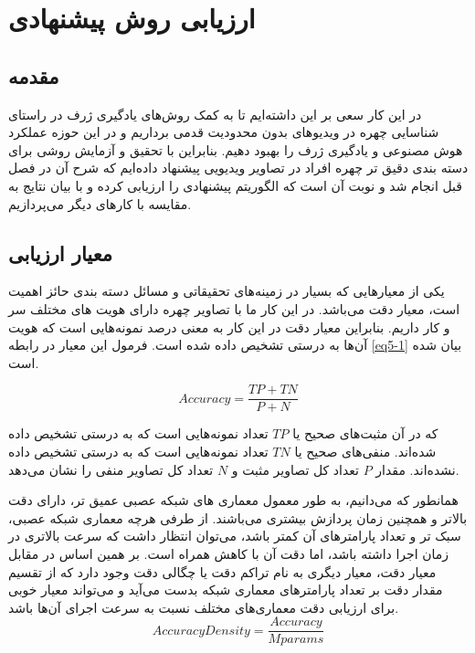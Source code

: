 \chapter{ارزیابی روش پیشنهادی}
\section{مقدمه}

در این کار سعی بر این داشته‌ایم تا به کمک روش‌های یادگیری ژرف در راستای شناسایی چهره در ویدیوهای بدون محدودیت قدمی برداریم و در این حوزه عملکرد هوش مصنوعی و یادگیری ژرف را بهبود دهیم. بنابراین با تحقیق و آزمایش روشی برای دسته بندی دقیق تر چهره افراد در تصاویر ویدیویی پیشنهاد داده‌ایم که شرح آن در فصل قبل انجام شد و نوبت آن است که الگوریتم پیشنهادی را ارزیابی کرده و با بیان نتایج به مقایسه با کارهای دیگر می‌پردازیم.

\section{معیار ارزیابی}
یکی از معیارهایی که بسیار در زمینه‌های تحقیقاتی و مسائل دسته بندی حائز اهمیت است، معیار دقت می‌باشد. در این کار ما با تصاویر چهره دارای هویت های مختلف سر و کار داریم. بنابراین معیار دقت در این کار به معنی درصد نمونه‌هایی است که هویت آن‌ها به درستی تشخیص داده شده است. فرمول این معیار در رابطه \ref{eq5-1} بیان شده است.

\begin{equation}\label{eq5-1}
Accuracy= \frac{TP+TN}{P+N}
\end{equation}

\noindent
که در آن مثبت‌های صحیح  یا $TP$ تعداد نمونه‌هایی است که به درستی تشخیص داده شده‌اند. منفی‌های صحیح  یا $TN$ تعداد نمونه‌هایی است که به درستی تشخیص داده نشده‌اند. مقدار $P$ تعداد کل تصاویر مثبت و $N$ تعداد کل تصاویر منفی را نشان می‌دهد.

\noindent
همانطور که می‌دانیم، به طور معمول معماری های شبکه عصبی عمیق تر، دارای دقت بالاتر و همچنین زمان پردازش بیشتری می‌باشند. از طرفی هرچه معماری شبکه عصبی، سبک تر و تعداد پارامترهای آن کمتر باشد، می‌توان انتظار داشت که سرعت بالاتری در زمان اجرا داشته باشد، اما دقت آن با کاهش همراه است. بر همین اساس در مقابل معیار دقت، معیار دیگری به نام تراکم دقت یا چگالی دقت وجود دارد که از تقسیم مقدار دقت بر تعداد پارامترهای معماری شبکه بدست می‌آید و می‌تواند معیار خوبی برای ارزیابی دقت معماری‌های مختلف نسبت به سرعت اجرای آن‌ها باشد.
‌\begin{equation}\label{eq5-2}
Accuracy Density = \frac{Accuracy}{Mparams}
\end{equation}

